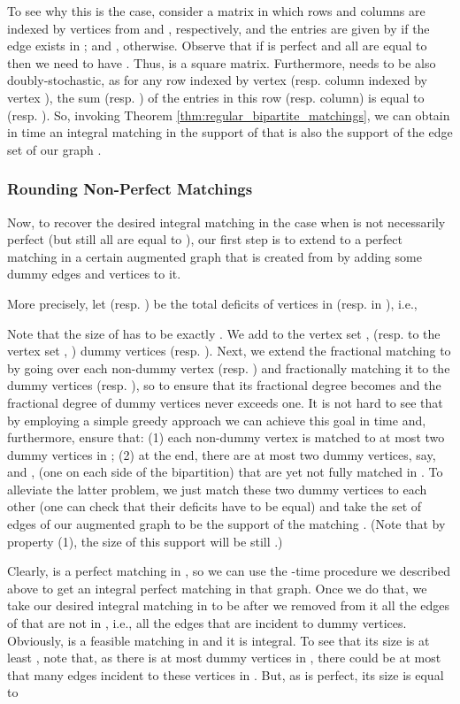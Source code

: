 \documentclass[11pt, letterpaper]{article}
\begin{document}
To see why this is the case, consider a  matrix  in which rows and columns are indexed by vertices from  and , respectively, and the entries are given by  if the edge  exists in ; and , otherwise. Observe that if  is perfect and all  are equal to  then we need to have . Thus,  is a square matrix. Furthermore,  needs to be also doubly-stochastic, as for any row indexed by vertex  (resp. column indexed by vertex ), the sum  (resp. ) of the entries in this row (resp. column) is equal to  (resp. ). So, invoking Theorem \ref{thm:regular_bipartite_matchings}, we can obtain in  time an integral matching  in the support of  that is also the support of the edge set  of our graph . 

\subsubsection*{Rounding Non-Perfect Matchings}

Now, to recover the desired integral matching in the case when  is not necessarily perfect (but still all  are equal to ), our first step is to extend  to a perfect matching  in a certain augmented graph  that is created from  by adding some dummy edges and vertices to it.


More precisely, let  (resp. ) be the total deficits of vertices in  (resp. in ), i.e., 

 Note that the size  of  has to be exactly . We add to the vertex set ,  (resp. to the vertex set , ) dummy vertices  (resp. ). Next, we extend the fractional matching  to  by going over each non-dummy vertex  (resp. ) and fractionally matching it to the dummy vertices  (resp. ), so to ensure that its fractional degree becomes  and the fractional degree of dummy vertices never exceeds one. It is not hard to see that by employing a simple greedy approach we can achieve this goal in  time and, furthermore, ensure that: (1) each non-dummy vertex is matched to at most two dummy vertices in ; (2) at the end, there are at most two dummy vertices, say,  and , (one on each side of the bipartition) that are yet not fully matched in . To alleviate the latter problem, we just match these two dummy vertices to each other (one can check that their deficits have to be equal) and take the set of edges  of our augmented graph  to be the support of the matching . (Note that by property (1), the size of this support will be still .)

Clearly,  is a perfect matching in , so we can use the -time procedure we described above to get an integral perfect matching  in that graph. Once we do that, we take our desired integral matching  in  to be  after we removed from it all the edges of  that are not in , i.e., all the edges that are incident to dummy vertices. Obviously,  is a feasible matching in  and it is integral. To see that its size is at least , note that, as there is at most  dummy vertices in , there could be at most that many edges incident to these vertices in . But, as  is perfect, its size is equal to 
\end{document}
